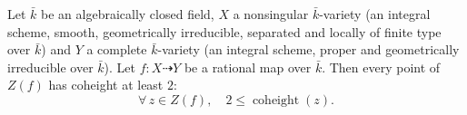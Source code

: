\begin{theorem}
  \label{thm:indeterminacy_codimGe2}
  \leanok
  Let \(\bar k\) be an algebraically closed field, \(X\) a nonsingular
  \(\bar k\)-variety (an integral scheme, smooth, geometrically irreducible,
  separated and locally of finite type over \(\bar k\)) and \(Y\) a complete
  \(\bar k\)-variety (an integral scheme, proper and geometrically irreducible
  over \(\bar k\)). Let \(f : X \dashrightarrow Y\) be a rational map over
  \(\bar k\). Then every point of \(Z(f)\) has coheight at least \(2\):
  \[
    \forall\, z \in Z(f), \quad 2 \leq \operatorname{coheight}(z).
  \]
\end{theorem}
